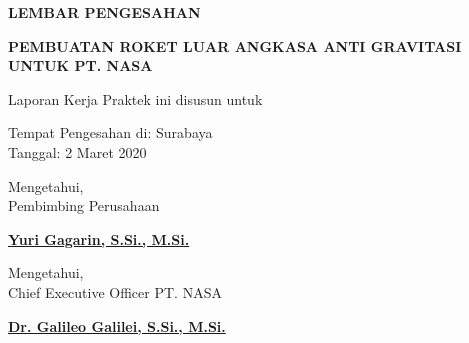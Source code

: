 \begin{center}
  {\Large \textbf{LEMBAR PENGESAHAN}}
  \vspace{6ex}


  {\large \textbf{PEMBUATAN ROKET LUAR ANGKASA ANTI GRAVITASI UNTUK PT. NASA}}
  \vspace{6ex}

  Laporan Kerja Praktek ini disusun untuk \lipsum[1][1]
  \vspace{2ex}

  Tempat Pengesahan di: Surabaya \\
  Tanggal: 2 Maret 2020
  \vspace{8ex}

  Mengetahui, \\
  Pembimbing Perusahaan
  \vspace{12ex}

  \textbf{\underline{Yuri Gagarin, S.Si., M.Si.}}
  \vspace{8ex}

  Mengetahui, \\
  Chief Executive Officer PT. NASA
  \vspace{12ex}

  \textbf{\underline{Dr. Galileo Galilei, S.Si., M.Si.}}

\end{center}